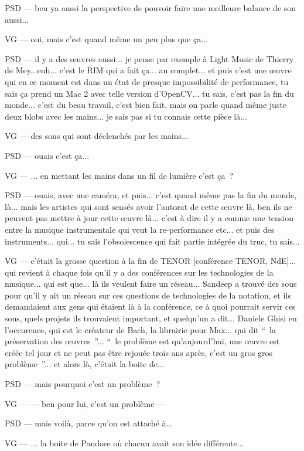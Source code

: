 PSD — ben ya aussi la perspective de pouvoir faire une meilleure balance de son aussi...

VG — oui, mais c'est quand même un peu plus que ça...

PSD — il y a des œuvres aussi... je pense par exemple à Light Music de Thierry de Mey...euh... c'est le RIM qui a fait ça... au complet... et puis c'est une œuvre qui en ce moment est dans un état de presque impossibilité de performance, tu sais ça prend un Mac 2 avec telle version d'OpenCV... tu sais, c'est pas la fin du monde... c'est du beau travail, c'est bien fait, mais on parle quand même juste deux blobs avec les mains... je sais pas si tu connais cette pièce là...

VG — des sons qui sont déclenchés par les mains...

PSD — ouais c'est ça...

VG — ... en mettant les mains dans un fil de lumière c'est ça ?

PSD — ouais, avec une caméra, et puis... c'est quand même pas la fin du monde, là... mais les artistes qui sont sensés avoir l'autorat de cette œuvre là, ben ils ne peuvent pas mettre à jour cette œuvre là... c'est à dire il y a comme une tension entre la musique instrumentale qui veut la re-performance etc... et puis des instruments... qui... tu sais l'obsolescence qui fait partie intégrée du truc, tu sais...

VG — c'était la grosse question à la fin de TENOR [conférence TENOR, NdE]... qui revient à chaque fois qu'il y a des conférences sur les technologies de la musique... qui est que... là ils veulent faire un réseau... Sandeep a trouvé des sous pour qu'il y ait un réseau sur ces questions de technologies de la notation, et ils demandaient aux gens qui étaient là à la conférence, ce à quoi pourrait servir ces sous, quels projets ils trouvaient important, et quelqu'un a dit... Daniele Ghisi en l'occurence, qui est le créateur de Bach, la librairie pour Max... qui dit “ la préservation des œuvres ”... “ le problème est qu'aujourd'hui, une œuvre est créée tel jour et ne peut pas être rejouée trois ans après, c'est un gros gros problème ”... et alors là, c'était la boite de...

PSD — mais pourquoi c'est un problème ?

VG — — ben pour lui, c'est un problème —

PSD — mais voilà, parce qu'on est attaché à...

VG — ... la boite de Pandore où chacun avait son idée différente...

